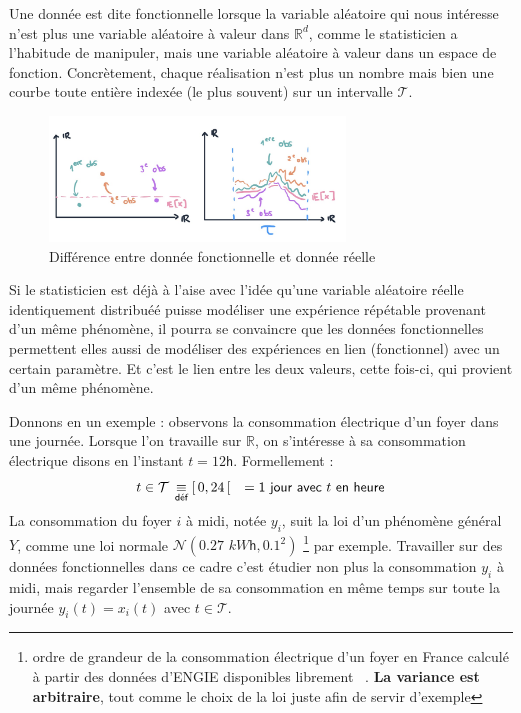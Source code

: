 
Une donnée est dite fonctionnelle lorsque la variable aléatoire qui nous intéresse n'est plus une variable aléatoire à valeur dans $\mathds R^d$, comme le statisticien a l'habitude de manipuler, mais une variable aléatoire à valeur dans un espace de fonction. Concrètement, chaque réalisation n'est plus un nombre mais bien une courbe toute entière indexée (le plus souvent) sur un intervalle $\mathcal T$. 

\begin{figure}[H]
    \centering
    \includegraphics[width=0.7\textwidth]{Images/motivation/donneesRvsFD.jpg}
    \caption{Différence entre donnée fonctionnelle et donnée réelle}
    \label{img:RvsFD}
\end{figure}

Si le statisticien est déjà à l'aise avec l'idée qu'une variable aléatoire réelle identiquement distribuéé puisse modéliser une expérience répétable provenant d'un même phénomène, il pourra se convaincre que les données fonctionnelles permettent elles aussi de modéliser des expériences en lien (fonctionnel) avec un certain paramètre. Et c'est le lien entre les deux valeurs, cette fois-ci, qui provient d'un même phénomène. 

\largeskip

Donnons en un exemple : observons la consommation électrique d'un foyer dans une journée. Lorsque l'on travaille sur $\mathds R$, on s'intéresse à sa consommation électrique disons en l'instant $t = 12\mathsf{h}$. Formellement :
$$t \in \mathcal T \, \isdef [\, 0,24 \,[ \quad = \textsf{1 jour avec } t \textsf{ en heure}$$ 
La consommation du foyer $i$ à midi, notée $y_i$, suit la loi d'un phénomène général $Y$, comme une loi normale $\mathcal N\left( 0.27 \, \, kW\mathsf h, 0.1^2 \right)$ 
%
\footnote{ ordre de grandeur de la consommation électrique d'un foyer en France calculé à partir des données d'ENGIE disponibles librement ~\cite{engie-data-conso-moy-par-an}. \textbf{La variance est arbitraire}, tout comme le choix de la loi juste afin de servir d'exemple } 
%
par exemple. Travailler sur des données fonctionnelles dans ce cadre c'est étudier non plus la consommation $y_i$ à midi, mais regarder l'ensemble de sa consommation en même temps sur toute la journée $y_i(t) = x_i(t)$ avec $t \in \mathcal T$. 

